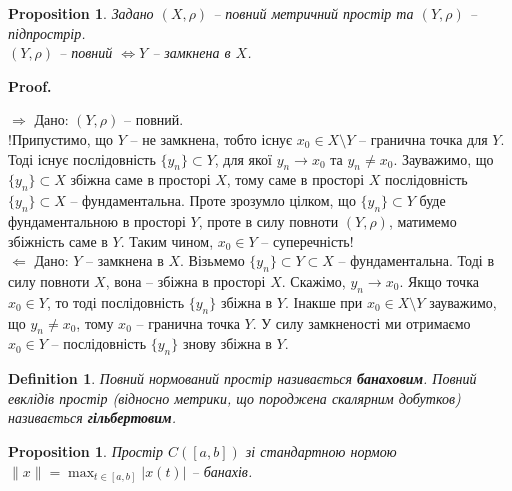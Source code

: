 \documentclass[a4paper, 10pt]{article}
\makeatletter
\def\rightproof{$\boxed{\Rightarrow}$ }
\def\leftproof{$\boxed{\Leftarrow}$ }
\theoremstyle{theoremdd}
\theoremstyle{theoremdd}
\newtheorem{definition}[theorem]{Definition}
\theoremstyle{theoremdd}
\theoremstyle{theoremdd}
\theoremstyle{theoremdd}
\newtheorem{proposition}[theorem]{Proposition}
\theoremstyle{theoremdd}
\theoremstyle{theoremdd}
\theoremstyle{theoremdd}
\renewenvironment{proof}[1][Proof.\\]{\par
\pushQED{\hfill \qed}%
\normalfont \topsep6\p@\@plus6\p@\relax
\trivlist
\item\relax
{\bfseries
#1\@addpunct{.}}\hspace\labelsep\ignorespaces
}{%
\popQED\endtrivlist\@endpefalse
}
\makeatother
\begin{document}
\begin{proposition}
Задано $(X,\rho)$ -- повний метричний простір та $(Y,\rho)$ -- підпрострір.\\
$(Y,\rho)$ -- повний $\iff Y$ -- замкнена в $X$.
\end{proposition}

\begin{proof}
\rightproof Дано: $(Y,\rho)$ -- повний.\\
!Припустимо, що $Y$ -- не замкнена, тобто існує $x_0 \in X \setminus Y$ -- гранична точка для $Y$. Тоді існує послідовність $\{y_n\} \subset Y$, для якої $y_n \to x_0$ та $y_n \neq x_0$. Зауважимо, що $\{y_n\} \subset X$ збіжна саме в просторі $X$, тому саме в просторі $X$ послідовність $\{y_n\} \subset X$ -- фундаментальна. Проте зрозумло цілком, що $\{y_n\} \subset Y$ буде фундаментальною в просторі $Y$, проте в силу повноти $(Y,\rho)$, матимемо збіжність саме в $Y$. Таким чином, $x_0 \in Y$ -- суперечність!
\bigskip \\
\leftproof Дано: $Y$ -- замкнена в $X$. Візьмемо $\{y_n\} \subset Y \subset X$ -- фундаментальна. Тоді в силу повноти $X$, вона -- збіжна в просторі $X$. Скажімо, $y_n \to x_0$. Якщо точка $x_0 \in Y$, то тоді послідовність $\{y_n\}$ збіжна в $Y$. Інакше при $x_0 \in X \setminus Y$ зауважимо, що $y_n \neq x_0$, тому $x_0$ -- гранична точка $Y$. У силу замкненості ми отримаємо $x_0 \in Y$ -- послідовність $\{y_n\}$ знову збіжна в $Y$.
\end{proof}

\begin{definition}
Повний нормований простір називається \textbf{банаховим}. Повний евклідів простір (відносно метрики, що породжена скалярним добутков) називається \textbf{гільбертовим}.
\end{definition}

\begin{proposition}
Простір $C([a,b])$ зі стандартною нормою $\|x\| = \displaystyle\max_{t \in [a,b]} |x(t)|$ -- банахів.
\end{proposition}
\end{document}
